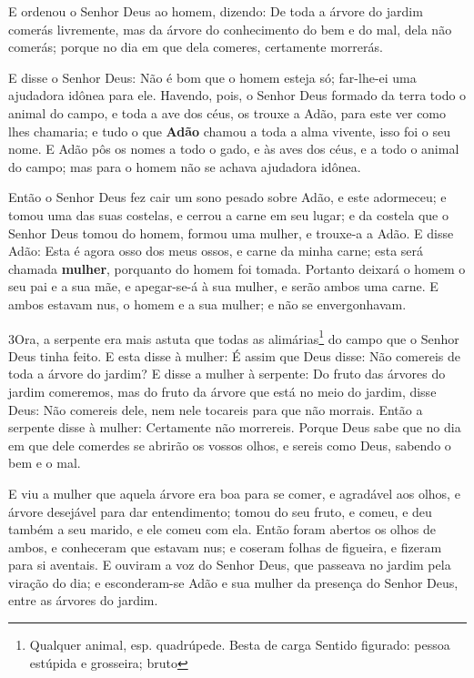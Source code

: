 E ordenou o Senhor Deus ao homem, dizendo: De toda a árvore do
jardim comerás livremente, mas da árvore do conhecimento do
bem e do mal, dela não comerás; porque no dia em que dela comeres,
certamente morrerás.

E disse o Senhor Deus: Não é bom que o homem esteja só;
far-lhe-ei uma ajudadora idônea para ele. Havendo, pois, o
Senhor Deus formado da terra todo o animal do campo, e toda a ave
dos céus, os trouxe a Adão, para este ver como lhes chamaria; e tudo
o que \textbf{Adão} chamou a toda a alma vivente, isso foi o seu
nome. E Adão pôs os nomes a todo o gado, e às aves dos céus,
e a todo o animal do campo; mas para o homem não se achava ajudadora
idônea.

Então o Senhor Deus fez cair um sono pesado sobre Adão, e este
adormeceu; e tomou uma das suas costelas, e cerrou a carne em seu
lugar; e da costela que o Senhor Deus tomou do homem, formou
uma mulher, e trouxe-a a Adão. E disse Adão: Esta é agora
osso dos meus ossos, e carne da minha carne; esta será chamada
\textbf{mulher}, porquanto do homem foi tomada. Portanto
deixará o homem o seu pai e a sua mãe, e apegar-se-á à sua mulher, e
serão ambos uma carne. E ambos estavam nus, o homem e a sua
mulher; e não se envergonhavam.

\smallskip

\lettrine{3} Ora, a serpente era mais astuta que todas as
alimárias\footnote{Qualquer animal, esp. quadrúpede. Besta de carga
Sentido figurado: pessoa estúpida e grosseira; bruto} do campo que o
Senhor Deus tinha feito. E esta disse à mulher: É assim que Deus
disse: Não comereis de toda a árvore do jardim? E disse a mulher
à serpente: Do fruto das árvores do jardim comeremos, mas do
fruto da árvore que está no meio do jardim, disse Deus: Não comereis
dele, nem nele tocareis para que não morrais. Então a serpente
disse à mulher: Certamente não morrereis. Porque Deus sabe que
no dia em que dele comerdes se abrirão os vossos olhos, e sereis
como Deus, sabendo o bem e o mal.

E viu a mulher que aquela árvore era boa para se comer, e
agradável aos olhos, e árvore desejável para dar entendimento; tomou
do seu fruto, e comeu, e deu também a seu marido, e ele comeu com
ela. Então foram abertos os olhos de ambos, e conheceram que
estavam nus; e coseram folhas de figueira, e fizeram para si
aventais. E ouviram a voz do Senhor Deus, que passeava no jardim
pela viração do dia; e esconderam-se Adão e sua mulher da presença
do Senhor Deus, entre as árvores do jardim.

